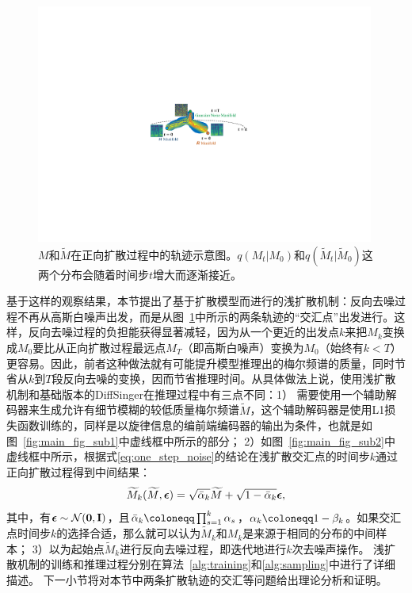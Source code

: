 \begin{figure}[htbp]
    \centering
    \includegraphics[width=0.99\textwidth]{figure/svs/manifold.pdf} %
    \caption{$M$和$\widetilde{M}$在正向扩散过程中的轨迹示意图。$q(M_t| M_0)$和$q(\widetilde{M}_t| \widetilde{M}_0)$这两个分布会随着时间步$t$增大而逐渐接近。}
    \label{fig:manifolds}
\end{figure}
基于这样的观察结果，本节提出了基于扩散模型而进行的浅扩散机制：反向去噪过程不再从高斯白噪声出发，而是从图~\ref{fig:manifolds}中所示的两条轨迹的``交汇点''出发进行。这样，反向去噪过程的负担能获得显著减轻，因为从一个更近的出发点$k$来把$M_k$变换成$M_0$要比从正向扩散过程最远点$M_T$（即高斯白噪声）变换为$M_0$（始终有$k < T$）更容易。因此，前者这种做法就有可能提升模型推理出的梅尔频谱的质量，同时节省从$k$到$T$段反向去噪的变换，因而节省推理时间。从具体做法上说，使用浅扩散机制和基础版本的DiffSinger在推理过程中有三点不同：1） 需要使用一个辅助解码器来生成允许有细节模糊的较低质量梅尔频谱$\widetilde{M}$，这个辅助解码器是使用L1损失函数训练的，同样是以旋律信息的编前端编码器的输出为条件，也就是如图~\ref{fig:main_fig_sub1}中虚线框中所示的部分；
2）如图~\ref{fig:main_fig_sub2}中虚线框中所示，根据式\eqref{eq:one_step_noise}的结论在浅扩散交汇点的时间步$k$通过正向扩散过程得到中间结果：
\begin{equation}
\widetilde{M}_k(\widetilde{M}, {\boldsymbol{\epsilon}}) = \sqrt{\bar\alpha_k}\widetilde{M} + \sqrt{1-\bar\alpha_k}{\boldsymbol{\epsilon}},
\end{equation}
其中，有${\boldsymbol{\epsilon}}\sim\mathcal{N}(\mathbf{0}, \mathbf{I})$，且$\bar\alpha_k \defeq \prod_{s=1}^k \alpha_s$，$\alpha_k \defeq 1-\beta_k$。如果交汇点时间步$k$的选择合适，那么就可以认为$\widetilde{M}_k$和$M_k$是来源于相同的分布的中间样本；
3）以为起始点$\widetilde{M}_k$进行反向去噪过程，即迭代地进行$k$次去噪声操作。
浅扩散机制的训练和推理过程分别在算法~\ref{alg:training}和\ref{alg:sampling}中进行了详细描述。
下一小节将对本节中两条扩散轨迹的交汇等问题给出理论分析和证明。
